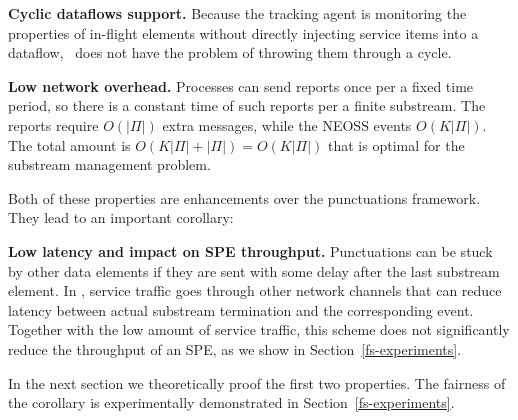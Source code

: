 {\bf Cyclic dataflows support.} Because the tracking agent is monitoring the properties of in-flight elements without directly injecting service items into a dataflow, \tracker\ does not have the problem of throwing them through a cycle.

{\bf Low network overhead.} Processes can send reports once per a fixed time period, so there is a constant time of such reports per a finite substream. The reports require $O(|\Pi|)$ extra messages, while the NEOSS events $O(K|\Pi|)$. The total amount is $O(K|\Pi| + |\Pi|) = O(K|\Pi|)$ that is optimal for the substream management problem.

Both of these properties are enhancements over the punctuations framework. They lead to an important corollary: 

{\bf Low latency and impact on SPE throughput.} Punctuations can be stuck by other data elements if they are sent with some delay after the last substream element. In \tracker, service traffic goes through other network channels that can reduce latency between actual substream termination and the corresponding event. Together with the low amount of service traffic, this scheme does not significantly reduce the throughput of an SPE, as we show in Section~\ref{fs-experiments}.

In the next section we theoretically proof the first two properties. The fairness of the corollary is experimentally demonstrated in Section~\ref{fs-experiments}.

